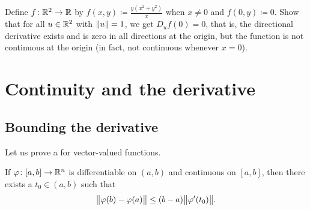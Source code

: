 \begin{exercise}
Define $f \colon {\mathbb{R}}^2 \to {\mathbb{R}}$ by $f(x,y) \coloneqq \frac{y(x^2+y^2)}{x}$
when $x \neq 0$ and $f(0,y) \coloneqq 0$.  Show that for all $u \in {\mathbb{R}}^2$
with $\lVert {u} \rVert=1$, we get $D_u f(0) = 0$, that is, the directional
derivative exists and is zero in all directions at the origin, but the
function is not continuous at the origin (in fact, not continuous whenever
$x=0$).
\end{exercise}


\sectionnewpage
\section{Continuity and the derivative}
\label{sec:svthedercont}



\subsection{Bounding the derivative}

Let us prove a  for vector-valued functions.

\begin{lemma} \label{lemma:mvtmv}
If $\varphi \colon [a,b] \to {\mathbb{R}}^n$ is differentiable on $(a,b)$ and
continuous on $[a,b]$, then there exists a $t_0 \in (a,b)$ such that
\begin{equation*}
\bigl\lVert {\varphi(b)-\varphi(a)} \bigr\rVert \leq (b-a) \bigl\lVert {\varphi'(t_0)} \bigr\rVert .
\end{equation*}
\end{lemma}

